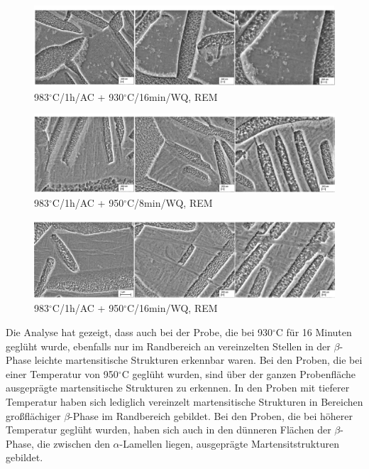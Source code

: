 \begin{figure}
	\centering
	\includegraphics[width=1.0\linewidth]{./Bilder/Abbildung 16.png}
	\caption[Abbildung 16]{983$^\circ$C/1h/AC + 930$^\circ$C/16min/WQ, REM}
	\label{fig:abbildung-16}
\end{figure}

\begin{figure}
	\centering
	\includegraphics[width=1.0\linewidth]{./Bilder/Abbildung 17.png}
	\caption[Abbildung 17]{983$^\circ$C/1h/AC + 950$^\circ$C/8min/WQ, REM}
	\label{fig:abbildung-17}
\end{figure}

\begin{figure}
	\centering
	\includegraphics[width=1.0\linewidth]{./Bilder/Abbildung 18.png}
	\caption[Abbildung 18]{983$^\circ$C/1h/AC + 950$^\circ$C/16min/WQ, REM}
	\label{fig:abbildung-18}
\end{figure}

Die Analyse hat gezeigt, dass auch bei der Probe, die bei 930$^\circ$C für 16 Minuten geglüht wurde, ebenfalls nur im Randbereich an vereinzelten Stellen in der $\beta$-Phase leichte martensitische Strukturen erkennbar waren.
Bei den Proben, die bei einer Temperatur von 950$^\circ$C geglüht wurden, sind über der ganzen Probenfläche ausgeprägte martensitische Strukturen zu erkennen. In den Proben mit tieferer Temperatur haben sich lediglich vereinzelt martensitische Strukturen in Bereichen großflächiger $\beta$-Phase im Randbereich gebildet. Bei den Proben, die bei höherer Temperatur geglüht wurden, haben sich auch in den dünneren Flächen der $\beta$-Phase, die zwischen den $\alpha$-Lamellen liegen, ausgeprägte Martensitstrukturen gebildet.


